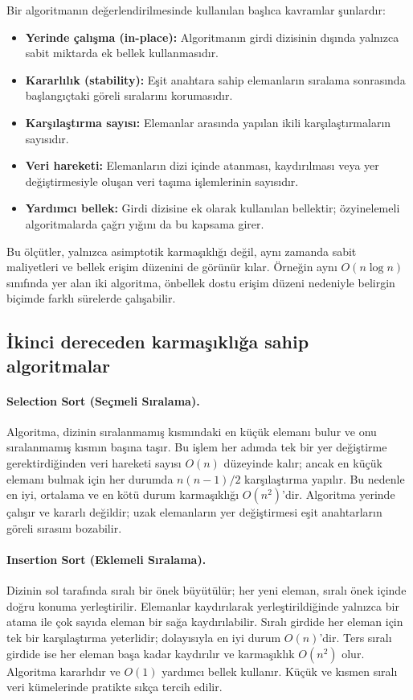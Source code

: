 \documentclass[12pt,a4paper]{article}
\begin{document}
Bir algoritmanın değerlendirilmesinde kullanılan başlıca kavramlar şunlardır:

\begin{itemize}
  \item \textbf{Yerinde çalışma (in-place):} Algoritmanın girdi dizisinin dışında
        yalnızca sabit miktarda ek bellek kullanmasıdır.
  \item \textbf{Kararlılık (stability):} Eşit anahtara sahip elemanların
        sıralama sonrasında başlangıçtaki göreli sıralarını korumasıdır.
  \item \textbf{Karşılaştırma sayısı:} Elemanlar arasında yapılan ikili
        karşılaştırmaların sayısıdır.
  \item \textbf{Veri hareketi:} Elemanların dizi içinde atanması, kaydırılması
        veya yer değiştirmesiyle oluşan veri taşıma işlemlerinin sayısıdır.
  \item \textbf{Yardımcı bellek:} Girdi dizisine ek olarak kullanılan bellektir;
        özyinelemeli algoritmalarda çağrı yığını da bu kapsama girer.
\end{itemize}

Bu ölçütler, yalnızca asimptotik karmaşıklığı değil, aynı zamanda sabit
maliyetleri ve bellek erişim düzenini de görünür kılar. Örneğin aynı $O(n \log n)$
sınıfında yer alan iki algoritma, önbellek dostu erişim düzeni nedeniyle belirgin
biçimde farklı sürelerde çalışabilir.

\subsection{İkinci dereceden karmaşıklığa sahip algoritmalar}

\paragraph{Selection Sort (Seçmeli Sıralama).}
Algoritma, dizinin sıralanmamış kısmındaki en küçük elemanı bulur ve onu
sıralanmamış kısmın başına taşır. Bu işlem her adımda tek bir yer değiştirme
gerektirdiğinden veri hareketi sayısı $O(n)$ düzeyinde kalır; ancak en küçük
elemanı bulmak için her durumda $n(n-1)/2$ karşılaştırma yapılır. Bu nedenle en
iyi, ortalama ve en kötü durum karmaşıklığı $O(n^2)$'dir. Algoritma yerinde
çalışır ve kararlı değildir; uzak elemanların yer değiştirmesi eşit anahtarların
göreli sırasını bozabilir.

\paragraph{Insertion Sort (Eklemeli Sıralama).}
Dizinin sol tarafında sıralı bir önek büyütülür; her yeni eleman, sıralı önek
içinde doğru konuma yerleştirilir. Elemanlar kaydırılarak yerleştirildiğinde
yalnızca bir atama ile çok sayıda eleman bir sağa kaydırılabilir. Sıralı girdide
her eleman için tek bir karşılaştırma yeterlidir; dolayısıyla en iyi durum
$O(n)$'dir. Ters sıralı girdide ise her eleman başa kadar kaydırılır ve karmaşıklık
$O(n^2)$ olur. Algoritma kararlıdır ve $O(1)$ yardımcı bellek kullanır. Küçük ve
kısmen sıralı veri kümelerinde pratikte sıkça tercih edilir.
\end{document}
